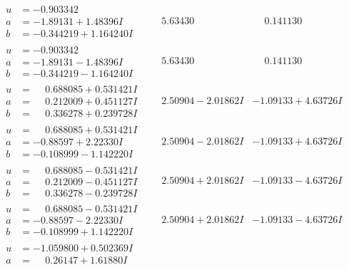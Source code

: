 \documentclass[1p]{elsarticle_modified}
\theoremstyle{definition}
\begin{document}
$$\begin{array}{c|c|c}
\begin{aligned}
u &= -0.903342\phantom{ +0.000000I} \\
a &= -1.89131 + 1.48396 I \\
b &= -0.344219 + 1.164240 I\end{aligned}
 & \phantom{-}5.63430\phantom{ +0.000000I} & \phantom{-}0.141130\phantom{ +0.000000I} \\ \hline\begin{aligned}
u &= -0.903342\phantom{ +0.000000I} \\
a &= -1.89131 - 1.48396 I \\
b &= -0.344219 - 1.164240 I\end{aligned}
 & \phantom{-}5.63430\phantom{ +0.000000I} & \phantom{-}0.141130\phantom{ +0.000000I} \\ \hline\begin{aligned}
u &= \phantom{-}0.688085 + 0.531421 I \\
a &= \phantom{-}0.212009 + 0.451127 I \\
b &= \phantom{-}0.336278 + 0.239728 I\end{aligned}
 & \phantom{-}2.50904 - 2.01862 I & -1.09133 + 4.63726 I \\ \hline\begin{aligned}
u &= \phantom{-}0.688085 + 0.531421 I \\
a &= -0.88597 + 2.22330 I \\
b &= -0.108999 - 1.142220 I\end{aligned}
 & \phantom{-}2.50904 - 2.01862 I & -1.09133 + 4.63726 I \\ \hline\begin{aligned}
u &= \phantom{-}0.688085 - 0.531421 I \\
a &= \phantom{-}0.212009 - 0.451127 I \\
b &= \phantom{-}0.336278 - 0.239728 I\end{aligned}
 & \phantom{-}2.50904 + 2.01862 I & -1.09133 - 4.63726 I \\ \hline\begin{aligned}
u &= \phantom{-}0.688085 - 0.531421 I \\
a &= -0.88597 - 2.22330 I \\
b &= -0.108999 + 1.142220 I\end{aligned}
 & \phantom{-}2.50904 + 2.01862 I & -1.09133 - 4.63726 I \\ \hline\begin{aligned}
u &= -1.059800 + 0.502369 I \\
a &= \phantom{-}0.26147 + 1.61880 I \\

\end{aligned}
\end{array}$$
\end{document}

